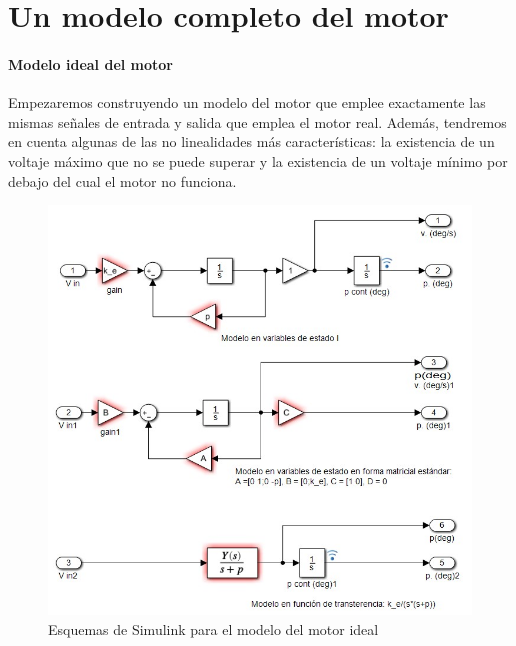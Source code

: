 \documentclass[10pt,a4paper]{report}
\begin{document}
\section{Un modelo completo del motor}\label{sec41}

\paragraph{Modelo ideal del motor} Empezaremos construyendo un modelo del motor que emplee exactamente las mismas señales de entrada y salida que emplea el motor real. Además, tendremos en cuenta algunas de las no linealidades más características: la existencia de un voltaje máximo que no se puede superar y la existencia de un voltaje mínimo por debajo del cual el motor no funciona.

\begin{figure}[h]
\centering
\includegraphics[scale=0.8]{modelo_motor1.jpg}
\caption{Esquemas de Simulink para el modelo del motor ideal}
\label{f23}
\end{figure}
\end{document}
